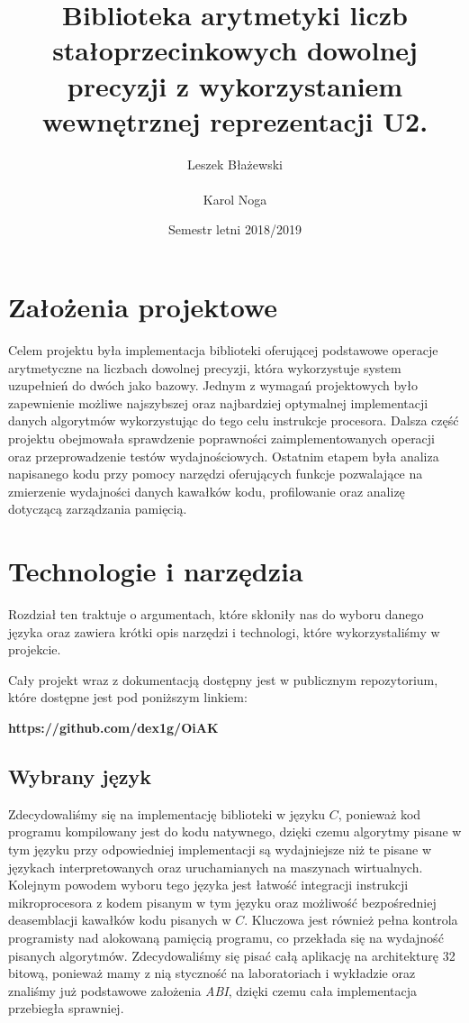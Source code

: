 \documentclass{article}
\title{Biblioteka arytmetyki liczb stałoprzecinkowych dowolnej precyzji z wykorzystaniem wewnętrznej reprezentacji U2.}
\author{Leszek Błażewski \\ \\Karol Noga}
\date{Semestr letni 2018/2019}
\begin{document}
\maketitle
\thispagestyle{empty}
\clearpage
\setcounter{page}{1}
\tableofcontents
\newpage{}

\section{Założenia projektowe}

Celem projektu była implementacja biblioteki oferującej podstawowe operacje arytmetyczne na liczbach dowolnej precyzji, która wykorzystuje system uzupełnień do dwóch jako bazowy. Jednym z wymagań projektowych było zapewnienie możliwe najszybszej oraz najbardziej optymalnej implementacji danych algorytmów wykorzystując do tego celu instrukcje procesora. Dalsza część projektu obejmowała sprawdzenie poprawności zaimplementowanych operacji oraz przeprowadzenie testów wydajnościowych. Ostatnim etapem była analiza napisanego kodu przy pomocy narzędzi oferujących funkcje pozwalające na zmierzenie wydajności danych kawałków kodu, profilowanie oraz analizę dotyczącą zarządzania pamięcią.

\section{Technologie i narzędzia}

Rozdział ten traktuje o argumentach, które skłoniły nas do wyboru danego języka oraz zawiera krótki opis narzędzi i technologi, które wykorzystaliśmy w projekcie.

Cały projekt wraz z dokumentacją dostępny jest w publicznym repozytorium, które dostępne jest pod poniższym linkiem:

\begin{center}
\textbf{https://github.com/dex1g/OiAK}
\end{center}{}

\subsection{Wybrany język}

Zdecydowaliśmy się na implementację biblioteki w języku $C$, ponieważ kod programu kompilowany jest do kodu natywnego, dzięki czemu algorytmy pisane w tym języku przy odpowiedniej implementacji są wydajniejsze niż te pisane w językach interpretowanych oraz uruchamianych na maszynach wirtualnych. Kolejnym powodem wyboru tego języka jest łatwość integracji instrukcji mikroprocesora z kodem pisanym w tym języku oraz możliwość bezpośredniej deasemblacji kawałków kodu pisanych w $C$. Kluczowa jest również pełna kontrola programisty nad alokowaną pamięcią programu, co przekłada się na wydajność pisanych algorytmów. Zdecydowaliśmy się pisać całą aplikację na architekturę 32 bitową, ponieważ mamy z nią styczność na laboratoriach i wykładzie oraz znaliśmy już podstawowe założenia \textit{ABI}, dzięki czemu cała implementacja przebiegła sprawniej.
\end{document}
